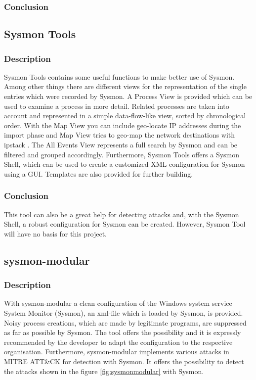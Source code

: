 \subsubsection{Conclusion}


\subsection{Sysmon Tools}
\subsubsection{Description}
Sysmon Tools \cite{SysmonTools} contains some useful functions to make better use of Sysmon. Among other things there are different views for the representation of the single entries which were recorded by Sysmon. A Process View is provided which can be used to examine a process in more detail. Related processes are taken into account and represented in a simple data-flow-like view, sorted by chronological order. With the Map View you can include geo-locate IP addresses during the import phase and Map View tries to geo-map the network destinations with ipstack \cite{ipstack}. The All Events View represents a full search by Sysmon and can be filtered and grouped accordingly. Furthermore, Sysmon Tools offers a Sysmon Shell, which can be used to create a customized XML configuration for Sysmon using a GUI. Templates are also provided for further building.
\subsubsection{Conclusion}
This tool can also be a great help for detecting attacks and, with the Sysmon Shell, a robust configuration for Sysmon can be created. However, Sysmon Tool will have no basis for this project.

\clearpage

\subsection{sysmon-modular}
\subsubsection{Description}
With sysmon-modular \cite{sysmon-modular} a clean configuration of the Windows system service System Monitor (Sysmon), an xml-file which is loaded by Sysmon, is provided. Noisy process creations, which are made by legitimate programs, are suppressed as far as possible by Sysmon. The tool offers the possibility and it is expressly recommended by the developer to adapt the configuration to the respective organisation. Furthermore, sysmon-modular implements various attacks in MITRE ATT\&CK for detection with Sysmon. It offers the possibility to detect the attacks shown in the figure \ref{fig:sysmonmodular} with Sysmon.

